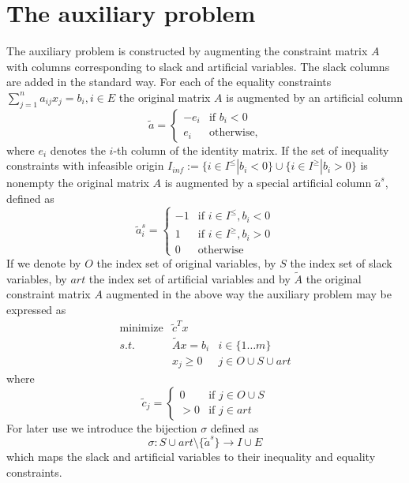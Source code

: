 \documentclass[a4paper]{article}
\begin{document}
\section{The auxiliary problem}
The auxiliary problem is constructed by augmenting the constraint matrix $A$
with columns corresponding to slack and artificial variables. The slack columns
are added in the standard way. For each of the equality constraints 
$\sum_{j=1}^{n} {a_{i j}x_{j}} = b_{i}, i \in E$ the original matrix $A$
is augmented by an artificial column
\begin{equation} \label{def:art_col}
 \tilde{a} =  \left\{
	        \begin{array}{ll}
  		  -e_{i} & \mbox{if $b_{i} < 0$} \\
		   e_{i}  & \mbox{otherwise,}
	        \end{array}
 	       \right.
\end{equation}
where $e_{i}$ denotes the $i$-th column of the identity matrix.
If the set of inequality constraints with infeasible origin
$I_{inf}:=\{i \in I^{\leq} \left| \right. b_{i} < 0 \} \cup 
  \{i \in I^{\geq} \left| \right. b_{i} > 0 \}$
 is nonempty the original matrix $A$
is augmented by a special artificial column $\tilde{a}^{s}$, defined as 
\begin{equation}\label{def:spec_art_col}
  \tilde{a}^{s}_{i} =  \left\{
	                 \begin{array}{ll}
  		           -1 & \mbox{if $i \in I^{\leq}, b_{i} < 0$} \\
		            1 & \mbox{if $i \in I^{\geq}, b_{i} > 0$} \\
		            0 & \mbox{otherwise}
	                 \end{array}
 	               \right.
\end{equation}
If we denote by $O$ the index set of original variables, by $S$ the index set
of slack variables, by $art$ the index set of artificial variables and by
$\tilde{A}$ the original constraint matrix $A$ augmented in the above way
the auxiliary problem may be expressed as
\begin{eqnarray*}
 \mbox{minimize} &  \tilde{c}^{T}x      & 	  \\
	s.t.	 & \tilde{A}x = b_{i}	& i \in \{1 \ldots m \}      \\
		 & x_{j} \geq 0	  	& j \in O \cup S \cup art  
\end{eqnarray*}
where
\begin{equation} \label{def:aux_c}
 \tilde{c}_{j} =  \left\{
	            \begin{array}{ll}
  		      0      & \mbox{if $j \in O \cup S$} \\
		      > 0 & \mbox{if $j \in art$}
	            \end{array}
 	          \right.
\end{equation}
For later use we introduce the bijection $\sigma$ defined as
\begin{equation}
\sigma: S \cup art \setminus \{\tilde{a}^{s}\} \rightarrow I \cup E
\end{equation}
which maps the slack and artificial variables to their inequality and equality
constraints. 
\end{document}
